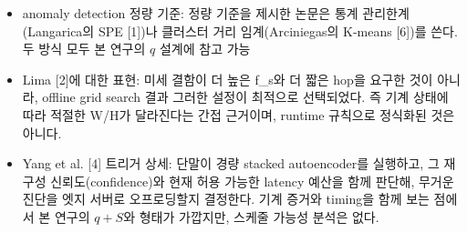 \documentclass[10pt]{article}
\begin{document}
\begin{itemize}
\item anomaly detection 정량 기준: 정량 기준을 제시한 논문은 통계 관리한계(Langarica의 SPE [1])나 클러스터 거리 임계(Arciniegas의 K-means [6])를 쓴다. 두 방식 모두 본 연구의 $q$ 설계에 참고 가능
\item Lima [2]에 대한 표현: 미세 결함이 더 높은 f\_s와 더 짧은 hop을 요구한 것이 아니라, offline grid search 결과 그러한 설정이 최적으로 선택되었다. 즉 기계 상태에 따라 적절한 W/H가 달라진다는 간접 근거이며, runtime 규칙으로 정식화된 것은 아니다.
\item Yang et al. [4] 트리거 상세: 단말이 경량 stacked autoencoder를 실행하고, 그 재구성 신뢰도(confidence)와 현재 허용 가능한 latency 예산을 함께 판단해, 무거운 진단을 엣지 서버로 오프로딩할지 결정한다. 기계 증거와 timing을 함께 보는 점에서 본 연구의 $q + S$와 형태가 가깝지만, 스케줄 가능성 분석은 없다.
\end{itemize}
\end{document}
